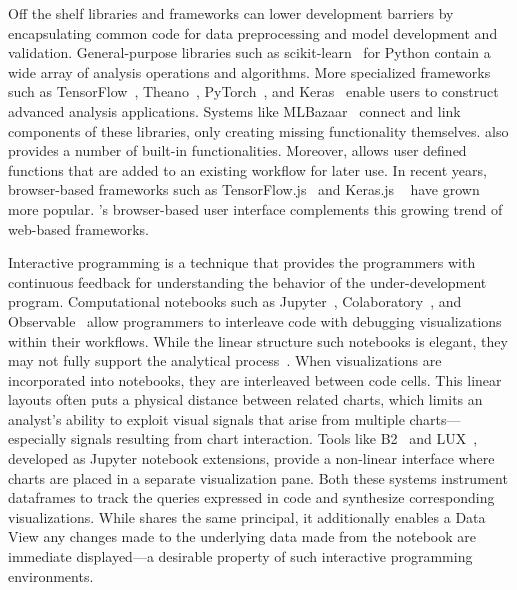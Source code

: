 Off the shelf libraries and frameworks can lower development barriers by encapsulating common code for data preprocessing
and model development and validation. General-purpose libraries such as scikit-learn~\cite{pedregosa2011scikit} for Python contain a wide array of analysis operations and algorithms. More specialized frameworks such
as TensorFlow~\cite{abadi2016tensorflow}, Theano~\cite{al2016theano}, PyTorch~\cite{paszke2017automatic},
and Keras~\cite{documentation2018keras} enable users to construct advanced analysis applications. Systems like MLBazaar~\cite{smith2020machine} connect and link components of these libraries, only creating
missing functionality themselves. \system also 
provides a number of built-in functionalities.
Moreover, \system allows user defined functions that are added to an existing workflow for later use. In recent years, browser-based
frameworks such as TensorFlow.js~\cite{smilkov2019tensorflow} and Keras.js ~\cite{kerasjs} have grown more popular. \system's browser-based user interface complements this growing trend of web-based frameworks. 

Interactive programming is a technique that provides the programmers with continuous feedback for understanding the behavior
of the under-development program. 
Computational notebooks such as Jupyter~\cite{jupyter}, Colaboratory~\cite{colab}, and Observable~\cite{observable} allow programmers
to interleave code with debugging visualizations within their workflows. While the linear structure such notebooks is elegant, they may not fully support the analytical process~\cite{rule2018exploration}. When visualizations are incorporated into notebooks, they are interleaved between code cells. This linear layouts often puts a physical distance
between related charts, which limits an analyst’s ability to exploit visual signals that arise from multiple charts—especially
signals resulting from chart interaction.
Tools like B2~\cite{wu2020b2} and LUX~\cite{lux}, developed as Jupyter notebook extensions, provide a non-linear interface where charts are placed in a separate visualization pane. Both these systems instrument dataframes to track
the queries expressed in code and synthesize corresponding visualizations. While \system shares the same principal, it additionally enables a Data View any changes made to the underlying data made from the notebook are immediate displayed---a desirable property of such interactive programming environments.

